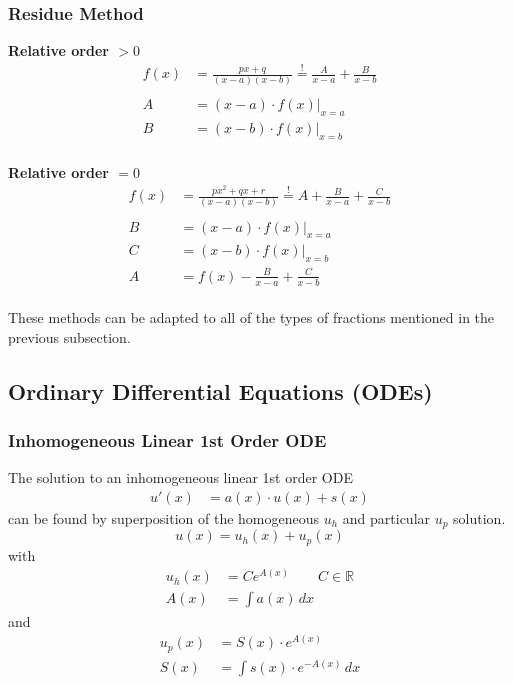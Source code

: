 \subsubsection{Residue Method}
\textbf{Relative order $>0$}
\begin{align*}
    f(x) & =\frac{px+q}{(x-a)(x-b)} \overset{!}{=} \frac{A}{x-a}+\frac{B}{x-b} \\\\
    A    & =(x-a)\cdot f(x)\Big|_{x=a}                                         \\
    B    & =(x-b)\cdot f(x)\Big|_{x=b}
\end{align*}\\
\textbf{Relative order $=0$}
\begin{align*}
    f(x) & =\frac{px^2+qx+r}{(x-a)(x-b)} \overset{!}{=} A+\frac{B}{x-a}+\frac{C}{x-b} \\\\
    B    & =(x-a)\cdot f(x)\Big|_{x=a}                                                \\
    C    & =(x-b)\cdot f(x)\Big|_{x=b}                                                \\
    A    & = f(x)-\frac{B}{x-a}+\frac{C}{x-b}
\end{align*}\\
These methods can be adapted to all of the types of fractions mentioned in the previous subsection.

\subsection{Ordinary Differential Equations (ODEs)}
\subsubsection{Inhomogeneous Linear 1st Order ODE}
The solution to an inhomogeneous linear 1st order ODE
\begin{align*}
    u'(x) & =a(x) \cdot u(x) + s(x)
\end{align*}
can be found by superposition of the homogeneous $u_h$ and particular $u_p$ solution.
\begin{equation*}
    u(x) = u_h(x) + u_p(x)
\end{equation*}
with
\begin{align*}
    u_h(x) & = Ce^{A(x)} \qquad C \in \mathbb{R} \\
    A(x)   & = \int a(x) \,dx
\end{align*}
and
\begin{align*}
    u_p(x) & = S(x) \cdot e^{A(x)}            \\
    S(x)   & = \int s(x)\cdot e^{-A(x)} \,dx
\end{align*}

